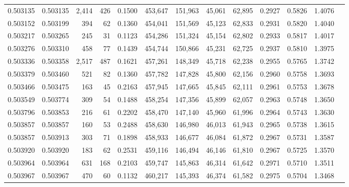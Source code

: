 \begin{tabular}{rrrrrrrrrrrrr}
0.503135 & 0.503135 & 2,414 &   426 &                                     0.1500 & 453,647 & 151,963 &  45,061 &  62,895 & 0.2927 & 0.5826 & 1.4076 \\
0.503152 & 0.503199 &   394 &    62 &                                     0.1360 & 454,041 & 151,569 &  45,123 &  62,833 & 0.2931 & 0.5820 & 1.4040 \\
0.503217 & 0.503265 &   245 &    31 &                                     0.1123 & 454,286 & 151,324 &  45,154 &  62,802 & 0.2933 & 0.5817 & 1.4017 \\
0.503276 & 0.503310 &   458 &    77 &                                     0.1439 & 454,744 & 150,866 &  45,231 &  62,725 & 0.2937 & 0.5810 & 1.3975 \\
0.503336 & 0.503358 & 2,517 &   487 &                                     0.1621 & 457,261 & 148,349 &  45,718 &  62,238 & 0.2955 & 0.5765 & 1.3742 \\
0.503379 & 0.503460 &   521 &    82 &                                     0.1360 & 457,782 & 147,828 &  45,800 &  62,156 & 0.2960 & 0.5758 & 1.3693 \\
0.503466 & 0.503475 &   163 &    45 &                                     0.2163 & 457,945 & 147,665 &  45,845 &  62,111 & 0.2961 & 0.5753 & 1.3678 \\
0.503549 & 0.503774 &   309 &    54 &                                     0.1488 & 458,254 & 147,356 &  45,899 &  62,057 & 0.2963 & 0.5748 & 1.3650 \\
0.503796 & 0.503853 &   216 &    61 &                                     0.2202 & 458,470 & 147,140 &  45,960 &  61,996 & 0.2964 & 0.5743 & 1.3630 \\
0.503857 & 0.503857 &   160 &    53 &                                     0.2488 & 458,630 & 146,980 &  46,013 &  61,943 & 0.2965 & 0.5738 & 1.3615 \\
0.503857 & 0.503913 &   303 &    71 &                                     0.1898 & 458,933 & 146,677 &  46,084 &  61,872 & 0.2967 & 0.5731 & 1.3587 \\
0.503920 & 0.503920 &   183 &    62 &                                     0.2531 & 459,116 & 146,494 &  46,146 &  61,810 & 0.2967 & 0.5725 & 1.3570 \\
0.503964 & 0.503964 &   631 &   168 &                                     0.2103 & 459,747 & 145,863 &  46,314 &  61,642 & 0.2971 & 0.5710 & 1.3511 \\
0.503967 & 0.503967 &   470 &    60 &                                     0.1132 & 460,217 & 145,393 &  46,374 &  61,582 & 0.2975 & 0.5704 & 1.3468 \\

\end{tabular}
